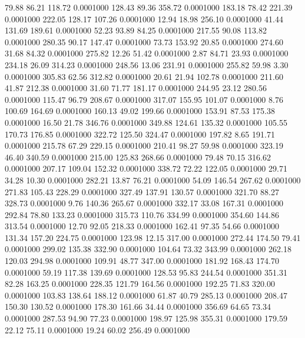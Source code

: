   79.88   86.21  118.72   0.0001000
 128.43   89.36  358.72   0.0001000
 183.18   78.42  221.39   0.0001000
 222.05  128.17  107.26   0.0001000
  12.94   18.98  256.10   0.0001000
  41.44  131.69  189.61   0.0001000
  52.23   93.89   84.25   0.0001000
 217.55   90.08  113.82   0.0001000
 280.35   90.17  147.47   0.0001000
  73.73  153.92   20.85   0.0001000
 274.60   31.68   84.32   0.0001000
 275.82   12.26   51.42   0.0001000
   2.87   84.71   23.93   0.0001000
 234.18   26.09  314.23   0.0001000
 248.56   13.06  231.91   0.0001000
 255.82   59.98    3.30   0.0001000
 305.83   62.56  312.82   0.0001000
  20.61   21.94  102.78   0.0001000
 211.60   41.87  212.38   0.0001000
  31.60   71.77  181.17   0.0001000
 244.95   23.12  280.56   0.0001000
 115.47   96.79  208.67   0.0001000
 317.07  155.95  101.07   0.0001000
   8.76  100.69  164.69   0.0001000
 160.13   49.02  199.66   0.0001000
 153.91   87.53  175.38   0.0001000
  16.50   21.78  346.76   0.0001000
 349.88  124.61  135.32   0.0001000
 105.55  170.73  176.85   0.0001000
 322.72  125.50  324.47   0.0001000
 197.82    8.65  191.71   0.0001000
 215.78   67.29  229.15   0.0001000
 210.41   98.27   59.98   0.0001000
 323.19   46.40  340.59   0.0001000
 215.00  125.83  268.66   0.0001000
  79.48   70.15  316.62   0.0001000
 207.17  109.04  152.32   0.0001000
 338.72   72.22  122.05   0.0001000
  29.71   34.28   10.30   0.0001000
 282.21   13.87   76.21   0.0001000
  54.09  146.54  267.62   0.0001000
 271.83  105.43  228.29   0.0001000
 327.49  137.91  130.57   0.0001000
 321.70   88.27  328.73   0.0001000
   9.76  140.36  265.67   0.0001000
 332.17   33.08  167.31   0.0001000
 292.84   78.80  133.23   0.0001000
 315.73  110.76  334.99   0.0001000
 354.60  144.86  313.54   0.0001000
  12.70   92.05  218.33   0.0001000
 162.41   97.35   54.66   0.0001000
 131.34  157.20  224.75   0.0001000
 123.98   12.15  317.00   0.0001000
 272.44  174.50   79.41   0.0001000
 299.02  135.38  332.90   0.0001000
 104.64   73.32  343.99   0.0001000
 262.18  120.03  294.98   0.0001000
 109.91   48.77  347.00   0.0001000
 181.92  168.43  174.70   0.0001000
  59.19  117.38  139.69   0.0001000
 128.53   95.83  244.54   0.0001000
 351.31   82.28  163.25   0.0001000
 228.35  121.79  164.56   0.0001000
 192.25   71.83  320.00   0.0001000
 103.83  138.64  188.12   0.0001000
  61.87   40.79  285.13   0.0001000
 208.47  150.30  130.52   0.0001000
 178.30  161.66   34.44   0.0001000
 356.69   64.65   73.34   0.0001000
 287.53   94.90   77.23   0.0001000
 198.97  125.98  355.31   0.0001000
 179.59   22.12   75.11   0.0001000
  19.24   60.02  256.49   0.0001000
